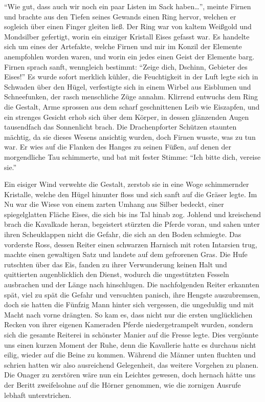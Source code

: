``Wie gut, dass auch wir noch ein paar Listen im Sack haben\dots'', meinte Firnen und brachte aus den Tiefen seines Gewands einen Ring hervor, welchen er sogleich über einen Finger gleiten ließ. Der Ring war von kaltem Weißgold und Mondsilber gefertigt, worin ein einziger Kristall Eises gefasst war. Es handelte sich um eines der Artefakte, welche Firnen und mir im Konzil der Elemente anempfohlen worden waren, und worin ein jedes einen Geist der Elemente barg. Firnen sprach sanft, wenngleich bestimmt: ``Zeige dich, Dschinn, Gebieter des Eises!'' Es wurde sofort merklich kühler, die Feuchtigkeit in der Luft legte sich in Schwaden über den Hügel, verfestigte sich in einem Wirbel aus Eisblumen und Schneefunken, der rasch menschliche Züge annahm. Klirrend entwuchs dem Ring die Gestalt, Arme sprossen aus dem scharf geschnittenen Leib wie Eiszapfen, und ein strenges Gesicht erhob sich über dem Körper, in dessen glänzenden Augen tausendfach das Sonnenlicht brach. Die Drachenpforter Schützen staunten mächtig, da sie dieses Wesens ansichtig wurden, doch Firnen wusste, was zu tun war. Er wies auf die Flanken des Hanges zu seinen Füßen, auf denen der morgendliche Tau schimmerte, und bat mit fester Stimme: ``Ich bitte dich, vereise sie.''

Ein eisiger Wind verwehte die Gestalt, zerstob sie in eine Woge schimmernder Kristalle, welche den Hügel hinunter floss und sich sanft auf die Gräser legte. Im Nu war die Wiese von einem zarten Umhang aus Silber bedeckt, einer spiegelglatten Fläche Eises, die sich bis ins Tal hinab zog. Johlend und kreischend brach die Kavalkade heran, begeistert stürzten die Pferde voran, und sahen unter ihren Scheuklappen nicht die Gefahr, die sich an den Boden schmiegte. Das vorderste Ross, dessen Reiter einen schwarzen Harnisch mit roten Intarsien trug, machte einen gewaltigen Satz und landete auf dem gefrorenen Gras. Die Hufe rutschten über das Eis, fanden zu ihrer Verwunderung keinen Halt und quittierten augenblicklich den Dienst, wodurch die ungestützten Fesseln ausbrachen und der Länge nach hinschlugen. Die nachfolgenden Reiter erkannten spät, viel zu spät die Gefahr und versuchten panisch, ihre Hengste auszubremsen, doch sie hatten die Fünfzig Mann hinter sich vergessen, die ungeduldig und mit Macht nach vorne drängten. So kam es, dass nicht nur die ersten unglücklichen Recken von ihrer eigenen Kameraden Pferde niedergetrampelt wurden, sondern sich die gesamte Reiterei in schönster Manier auf die Fresse legte. Dies vergönnte uns einen kurzen Moment der Ruhe, denn die Kavallerie hatte es durchaus nicht eilig, wieder auf die Beine zu kommen. Während die Männer unten fluchten und schrien hatten wir also ausreichend Gelegenheit, das weitere Vorgehen zu planen. Die Onager zu zerstören wäre nun ein Leichtes gewesen, doch hernach hätte uns der Beritt zweifelsohne auf die Hörner genommen, wie die zornigen Ausrufe lebhaft unterstrichen.

